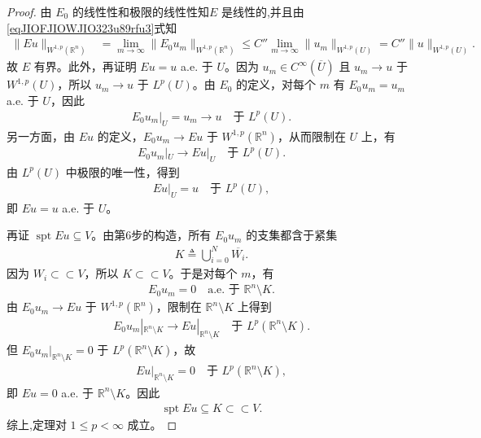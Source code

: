 \documentclass[../../main.tex]{subfiles}
\begin{document}
\begin{proof}
由 \(E_0\) 的线性性和极限的线性性知\(E\) 是线性的,并且由\eqref{eqJIOFJIOWJIO323u89rfu3}式知
\begin{align*}
\|E u\|_{W^{1,p}(\mathbb{R}^n)}
&=\lim\limits_{m\to\infty}\|E_0 u_m\|_{W^{1,p}(\mathbb{R}^n)}
\leqslant C''\lim\limits_{m\to\infty}\|u_m\|_{W^{1,p}(U)}
=C''\|u\|_{W^{1,p}(U)}.
\end{align*}
故 \(E\) 有界。此外，再证明 \(Eu=u\) a.e. 于 \(U\)。因为 \(u_m\in C^\infty(\overline U)\) 且 \(u_m\to u\) 于 \(W^{1,p}(U)\)，所以 \(u_m\to u\) 于 \(L^p(U)\)。由 \(E_0\) 的定义，对每个 \(m\) 有 \(E_0 u_m=u_m\) a.e. 于 \(U\)，因此
\begin{align*}
E_0 u_m|_U=u_m\to u\quad \text{于 } L^p(U).
\end{align*}
另一方面，由 \(Eu\) 的定义，\(E_0 u_m\to Eu\) 于 \(W^{1,p}(\mathbb R^n)\)，从而限制在 \(U\) 上，有
\begin{align*}
E_0 u_m|_U\to Eu|_U\quad \text{于 } L^p(U).
\end{align*}
由 \(L^p(U)\) 中极限的唯一性，得到
\begin{align*}
Eu|_U=u\quad \text{于 } L^p(U),
\end{align*}
即 \(Eu=u\) a.e. 于 \(U\)。

再证 \(\operatorname{spt}Eu\subseteq V\)。由第6步的构造，所有 \(E_0 u_m\) 的支集都含于紧集
\begin{align*}
K\triangleq \bigcup_{i=0}^N \overline{W_i}.
\end{align*}
因为 \(W_i\subset\subset V\)，所以 \(K\subset\subset V\)。于是对每个 \(m\)，有
\begin{align*}
E_0 u_m=0\quad \text{a.e. 于 } \mathbb R^n\setminus K.
\end{align*}
由 \(E_0 u_m\to Eu\) 于 \(W^{1,p}(\mathbb R^n)\)，限制在 \(\mathbb R^n\setminus K\) 上得到
\begin{align*}
E_0 u_m|_{\mathbb R^n\setminus K}\to Eu|_{\mathbb R^n\setminus K}\quad \text{于 } L^p(\mathbb R^n\setminus K).
\end{align*}
但 \(E_0 u_m|_{\mathbb R^n\setminus K}=0\) 于 \(L^p(\mathbb R^n\setminus K)\)，故
\begin{align*}
Eu|_{\mathbb R^n\setminus K}=0\quad \text{于 } L^p(\mathbb R^n\setminus K),
\end{align*}
即 \(Eu=0\) a.e. 于 \(\mathbb R^n\setminus K\)。因此
\begin{align*}
\operatorname{spt}Eu\subseteq K\subset\subset V.
\end{align*}
综上,定理对 \(1\leqslant p<\infty\) 成立。


\end{proof}
\end{document}
